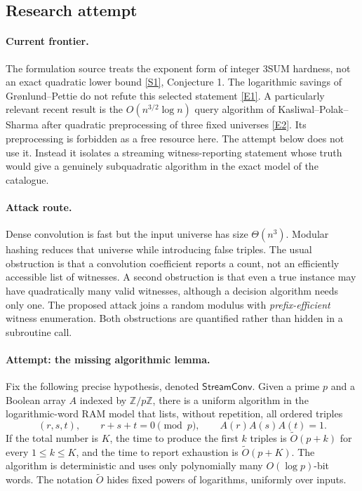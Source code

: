 \documentclass[11pt,a4paper]{article}
\newcommand{\Z}{\mathbb{Z}}
\newcommand{\sref}[2]{\hyperlink{source:#1:#2}{[S#2]}}
\newcommand{\eref}[2]{\hyperlink{extra:#1:#2}{[E#2]}}
\numberwithin{equation}{section}
\begin{document}
\subsection{Research attempt}

\paragraph{Current frontier.}
The formulation source treats the exponent form of integer 3SUM hardness,
not an exact quadratic lower bound \sref{161}{1}, Conjecture 1. The
logarithmic savings of Gr\o nlund--Pettie do not refute this selected
statement \eref{161}{1}. A particularly relevant recent result is the
$O(n^{3/2}\log n)$ query algorithm of Kasliwal--Polak--Sharma after
quadratic preprocessing of three fixed universes
\eref{161}{2}. Its preprocessing is forbidden as a free resource here.
The attempt below does not use it. Instead it isolates a streaming
witness-reporting statement whose truth would give a genuinely
subquadratic algorithm in the exact model of the catalogue.

\paragraph{Attack route.}
Dense convolution is fast but the input universe has size $\Theta(n^3)$.
Modular hashing reduces that universe while introducing false triples.
The usual obstruction is that a convolution coefficient reports a count,
not an efficiently accessible list of witnesses. A second obstruction is
that even a true instance may have quadratically many valid witnesses,
although a decision algorithm needs only one. The proposed attack joins a
random modulus with \emph{prefix-efficient} witness enumeration. Both
obstructions are quantified rather than hidden in a subroutine call.

\paragraph{Attempt: the missing algorithmic lemma.}
Fix the following precise hypothesis, denoted $\mathsf{StreamConv}$.
Given a prime $p$ and a Boolean array $A$ indexed by $\Z/p\Z$, there is a
uniform algorithm in the logarithmic-word RAM model that lists, without
repetition, all ordered triples
\begin{equation}\label{161:residue-triples}
 (r,s,t),\qquad r+s+t=0\pmod p,\qquad A(r)A(s)A(t)=1.
\end{equation}
If the total number is $K$, the time to produce the first $k$ triples is
$\widetilde O(p+k)$ for every $1\le k\le K$, and the time to report
exhaustion is $\widetilde O(p+K)$. The algorithm is deterministic and uses
only polynomially many $O(\log p)$-bit words. The notation
$\widetilde O$ hides fixed powers of logarithms, uniformly over inputs.
\end{document}

